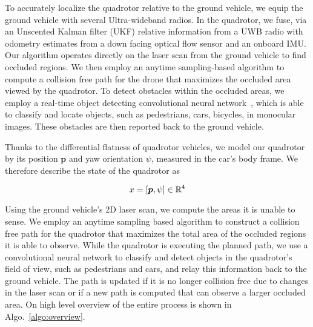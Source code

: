 
To accurately localize the quadrotor relative to the ground vehicle, we equip the ground vehicle with several Ultra-wideband radios. In the quadrotor, we fuse, via an Unscented Kalman filter (UKF) relative information from a UWB radio with odometry estimates from a down facing optical flow sensor and an onboard IMU.
Our algorithm operates directly on the laser scan from the ground vehicle to find occluded
regions.
We then employ an anytime sampling-based algorithm to compute a collision free path for the drone
that maximizes the occluded area viewed by the quadrotor.
To detect obstacles within the occluded areas, we employ a real-time object
detecting convolutional neural network~\cite{redmond2016you}, which is able to
classify and locate objects, such as pedestrians, cars, bicycles, in monocular
images.  These obstacles are then reported back to the ground vehicle.



Thanks to the differential flatness of quadrotor vehicles, we model our quadrotor by its position $\bm{p}$ and yaw orientation $\psi$, measured in the car's body frame. We therefore describe the state of the quadrotor as

$$
    x = [\bm{p}, \psi] \in \mathbb{R}^4
$$

Using the ground vehicle's 2D laser scan, we compute the areas it is unable to
sense. We employ an anytime sampling based algorithm to construct a collision
free path for the quadrotor that maximizes the total area of the occluded
regions it is able to observe. While the quadrotor is executing the planned
path, we use a convolutional neural network to classify and detect objects in
the quadrotor's field of view, such as pedestrians and cars, and relay this
information back to the ground vehicle. The path is updated if it is no longer
collision free due to changes in the laser scan or if a new path is computed
that can observe a larger occluded area. On high level overview of the entire
process is shown in Algo.~\ref{algo:overview}.

